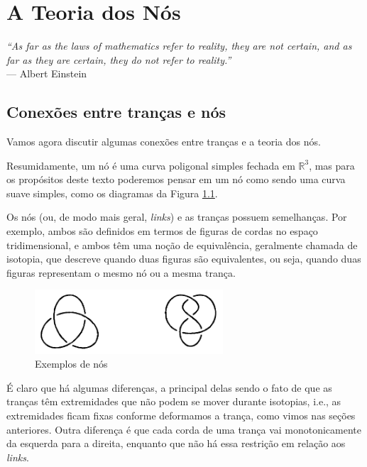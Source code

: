 \chapter[A Teoria dos Nós]{A Teoria dos Nós}
\label{cap-5}
\chaptermark{}
%
\hfill%
\begin{minipage}{10cm}
\begin{flushright}
\rightskip=0.5cm
\textit{``As far as the laws of mathematics refer to reality, they are not certain, and as far as they are certain, they do not refer to reality.''}
\\[0.1cm]
\rightskip=0.5cm
--- Albert Einstein
\end{flushright}
\end{minipage}

\section{Conexões entre tranças e nós}

    Vamos agora discutir algumas conexões entre tranças e a teoria dos nós.
    
	\par\vspace{0.3cm} Resumidamente, um nó é uma curva poligonal simples fechada em $\mathbb{R}^3$, 
	mas para os propósitos deste texto poderemos pensar em um nó como sendo uma curva suave simples, 
	como os diagramas da Figura \ref{exemplos de nos}.
	
	\par\vspace{0.3cm} Os nós (ou, de modo mais geral, \textit{links}) e as tranças possuem semelhanças. 
	Por exemplo, ambos são definidos em termos de figuras de cordas no espaço tridimensional, e ambos 
	têm uma noção de equivalência, geralmente chamada de isotopia, que descreve quando duas figuras 
	são equivalentes, ou seja, quando duas figuras representam o mesmo nó ou a mesma trança.  
	\begin{figure}[H]
	\begin{center}
		\includegraphics[width=7cm]{Images/exemplos_de_no.png}
	\end{center}\caption{Exemplos de nós}
	\label{exemplos de nos}
	\end{figure}
	\par\vspace{0.3cm} É claro que há algumas diferenças, a principal delas sendo o fato de que 
	as tranças têm extremidades que não podem se mover durante isotopias, i.e., as extremidades 
	ficam fixas conforme deformamos a trança, como vimos nas seções anteriores. Outra diferença 
	é que cada corda de uma trança vai monotonicamente da esquerda para a direita, enquanto que 
	não há essa restrição em relação aos \textit{links}.
	
